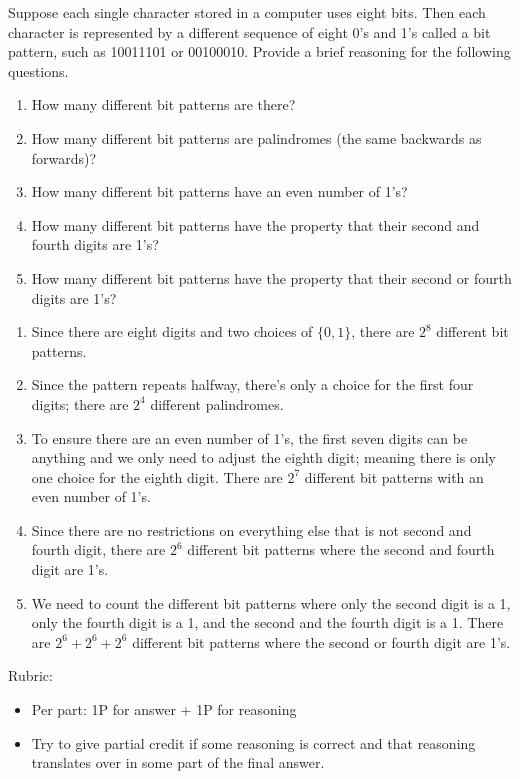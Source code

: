 \documentclass{article}
\theoremstyle{definition}
\begin{document}
\begin{question}{10}
    Suppose each single character stored in a computer uses eight bits. 
    Then each character is represented by a different sequence of eight 0's and 1's called a bit pattern, 
    such as 10011101 or 00100010. Provide a brief reasoning for the following questions.
        \begin{enumerate}
            \item How many different bit patterns are there?
            \item How many different bit patterns are palindromes (the same backwards as forwards)?
            \item How many different bit patterns have an even number of 1's?
            \item How many different bit patterns have the property that their second and fourth digits are 1's?
            \item How many different bit patterns have the property that their second or fourth digits are 1's?
        \end{enumerate}
\end{question}
\begin{solution}
    \begin{enumerate}
        \item Since there are eight digits and two choices of $\{0, 1\}$, there are $2^8$ different bit patterns. 
        \item Since the pattern repeats halfway, there's only a choice for the first four digits; there are $2^4$ different palindromes.
        \item To ensure there are an even number of 1's, the first seven digits can be anything and we only need to adjust the eighth digit; meaning there is only one choice for the eighth digit. There are $2^7$ different bit patterns with an even number of 1's.
        \item Since there are no restrictions on everything else that is not second and fourth digit, there are $2^6$ different bit patterns where the second and fourth digit are 1's.
        \item We need to count the different bit patterns where only the second digit is a 1, only the fourth digit is a 1, and the second and the fourth digit is a 1. There are $2^6+2^6+2^6$ different bit patterns where the second or fourth digit are 1's.
    \end{enumerate}
    
{\color{red} Rubric:
\begin{itemize}
\item Per part: 1P for answer + 1P for reasoning
\item Try to give partial credit if some reasoning is correct and that reasoning translates over in some part of the final answer.
\end{itemize}}
\end{solution}
\end{document}
